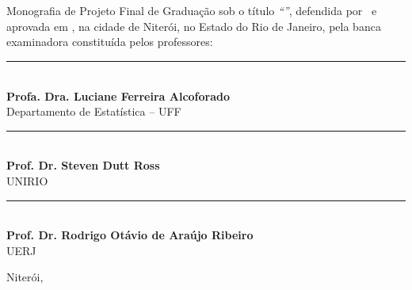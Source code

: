 \documentclass[12pt,a4paper,header]{abnt}
\begin{document}
\begin{folhadeaprovacao}

\thispagestyle{logouff}

\hspace{.2\textwidth} %
\begin{minipage}{.7\textwidth}

\begin{flushright}

{\large \bf \ABNTautordata}\\[1cm]

{\large \bf \ABNTtitulodata}\\[1cm]

\end{flushright}

Monografia de Projeto Final de Graduação sob o título \textit{``\ABNTtitulodata''},
defendida por \ABNTautordata~e aprovada em \ABNTdatadata, na cidade de Niterói,
no Estado do Rio de Janeiro, pela banca examinadora constituída pelos
professores:

\begin{flushright}

\begin{espacosimples}



\vspace{2cm}
\noindent\rule{8cm}{0.4pt}\\
{\bf Profa. Dra. Luciane Ferreira Alcoforado}\\
Departamento de Estatística -- UFF\\


\vspace{2cm}
\noindent\rule{8cm}{0.4pt}\\
{\bf Prof. Dr. Steven Dutt Ross}\\
UNIRIO\\


\vspace{2cm}
\noindent\rule{8cm}{0.4pt}\\
{\bf Prof. Dr. Rodrigo Otávio de Araújo Ribeiro}\\
UERJ\\

\end{espacosimples}

\end{flushright}

\vspace{2cm}
\hfill Niterói, \ABNTdatadata

\end{minipage}



\end{folhadeaprovacao}
\end{document}
